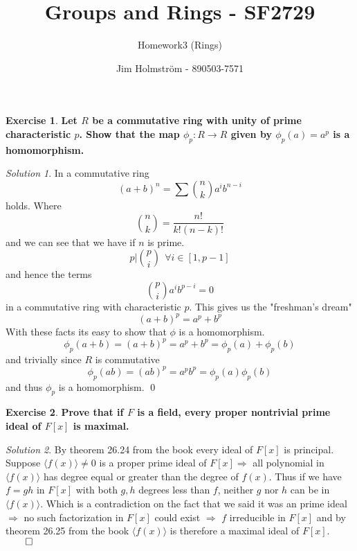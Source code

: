 \documentclass[a4paper,twoside=false,abstract=false,numbers=noenddot,
titlepage=false,headings=small,parskip=half,version=last]{scrartcl}
\author{Jim Holmström - 890503-7571}
\title{Groups and Rings - SF2729}
\subtitle{Homework3 (Rings)}
\theoremstyle{definition}
\newtheorem{exercise}{Exercise}
\theoremstyle{remark}
\newtheorem*{solution}{Solution}
\begin{document}
\maketitle
\thispagestyle{empty}

\begin{exercise}
{\bf
Let $R$ be a commutative ring with unity of prime characteristic $p$. Show that
the map $\phi_p:R\rightarrow R$ given by $\phi_p(a)=a^p$ is a homomorphism.
}
\end{exercise}
\begin{solution}
In a commutative ring 
\begin{equation}
    (a+b)^n=\sum \binom{n}{k} a^ib^{n-i}
\end{equation}
holds. Where
\begin{equation}
    \binom{n}{k} = \frac{n!}{k!(n-k)!}
\end{equation}
and we can see that we have if $n$ is prime.
\begin{equation}
    p|\binom{p}{i} ~~ \forall i \in \left[1,p-1\right]
\end{equation}
and hence the terms
\begin{equation}
    \binom{p}{i}a^ib^{p-i}=0
\end{equation}
in a commutative ring with characteristic $p$. This gives us the "freshman's dream"
\begin{equation}
    (a+b)^p=a^p+b^p
\end{equation}
With these facts its easy to show that $\phi$ is a homomorphism.
\begin{equation}
    \phi_p(a+b)=(a+b)^p=a^p+b^p=\phi_p(a)+\phi_p(b)
\end{equation}
and trivially since $R$ is commutative
\begin{equation}
    \phi_p(ab)=(ab)^p=a^pb^p=\phi_p(a)\phi_p(b)
\end{equation}
and thus $\phi_p$ is a homomorphism. \qed

\end{solution}
\pagebreak
\begin{exercise}
{\bf
Prove that if $F$ is a field, every proper nontrivial prime ideal of
$F\left[x\right]$ is maximal.
}
\end{exercise}
\begin{solution}
By theorem 26.24 from the book every ideal of $F\left[x\right]$ is principal.
Suppose $\langle f(x) \rangle \neq {0}$ is a proper prime ideal of
$F\left[x\right] \Rightarrow$ all polynomial in $\langle f(x) \rangle$ has
degree equal or greater than the degree of $f(x)$. Thus if we have $f=gh$
in $F\left[x\right]$ with both $g,h$ degrees less than $f$, neither $g$ nor $h$
can be in $\langle f(x) \rangle$. Which is a contradiction on the fact that we
said it was an prime ideal $\Rightarrow$ no such factorization in
$F\left[x\right]$ could exist $\Rightarrow$ $f$ irreducible in
$F\left[x\right]$ and by theorem 26.25 from the book $\langle f(x) \rangle$ is
therefore a maximal ideal of $F\left[x\right]$. $\qed$

\end{solution}

\end{document}
